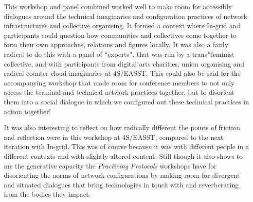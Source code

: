 This workshop and panel combined worked well to make room for accessibly
dialogues around the technical imaginaries and configuration practices
of network infrastructures and collective organising. It formed a
context where In-grid and participants could question how communities
and collectives come together to form their own approaches, relations
and figures locally. It was also a fairly radical to do this with a
panel of ``experts'', that was run by a trans*feminist collective, and
with participants from digital arts charities, union organising and
radical counter cloud imaginaries at 4S/EASST. This could also be said
for the accompanying workshop that made room for conference members to
not only access the terminal and technical network practices together,
but to disorient them into a social dialogue in which we configured out
these technical practices in action together!

It was also interesting to reflect on how radically different the points
of friction and reflection were in this workshop at 4S/EASST, compared
to the next iteration with In-grid. This was of course because it was
with different people in a different contexts and with slightly altered
content. Still though it also shows to me the generative capacity the
\emph{Practicing Protocols} workshops have for disorienting the norms of
network configurations by making room for divergent and situated
dialogues that bring technologies in touch with and reverberating from
the bodies they impact.

